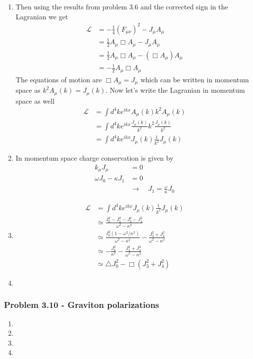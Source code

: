 \documentclass[10pt,a4paper]{book}
\theoremstyle{definition}
\begin{document}
\begin{enumerate}[label=(\alph*)]
\item Then using the results from problem 3.6 and the corrected sign in the Lagranian we get
\begin{align}
\mathcal{L}&=-\frac{1}{4}(F_{\mu\nu})^2-J_\mu A_\mu\\
&=\frac{1}{2}A_\mu\Box A_\mu-J_\mu A_\mu\\
&=\frac{1}{2}A_\mu\Box A_\mu-(\Box A_\mu) A_\mu\\
&=-\frac{1}{2}A_\mu\Box A_\mu
\end{align}
The equations of motion are $\Box A_\mu=J_\mu$ which can be written in momentum space as $k^2A_\mu(k)=J_\mu(k)$. Now let's write the Lagranian in momentum space as well
\begin{align}
\mathcal{L}&=\int d^4k e^{ikx}A_\mu(k)k^2A_\mu(k)\\
&=\int d^4k e^{ikx}\frac{J_\mu(k)}{k^2}k^2\frac{J_\mu(k)}{k^2}\\
&=\int d^4k e^{ikx}J_\mu(k)\frac{1}{k^2}J_\mu(k)
\end{align} 
\item In momentum space charge conservation is given by
\begin{align}
  k_\mu J_\mu&=0\\
  \omega J_0-\kappa J_1&=0\\
  &\rightarrow\quad J_1=\frac{\omega}{\kappa}J_0
\end{align}

\item
\begin{align}
\mathcal{L}&=\int d^4k e^{ikx}J_\mu(k)\frac{1}{k^2}J_\mu(k)\\
&\simeq\frac{J_0^2-J_1^2-J_3^2-J_4^2}{\omega^2-\kappa^2}\\
&\simeq\frac{J_0^2(1-\omega^2/\kappa^2)}{\omega^2-\kappa^2}-\frac{J_3^2+J_4^2}{\omega^2-\kappa^2}\\
&\simeq-\frac{J_0^2}{\kappa^2}-\frac{J_3^2+J_4^2}{\omega^2-\kappa^2}\\
&\simeq\triangle J_0^2-\Box(J_3^2+J_4^2)
\end{align} 

\item
\end{enumerate}


\subsubsection{Problem 3.10 - Graviton polarizations}
\begin{enumerate}[label=(\alph*)]
\item
\item
\item
\item
\end{enumerate}
\end{document}
